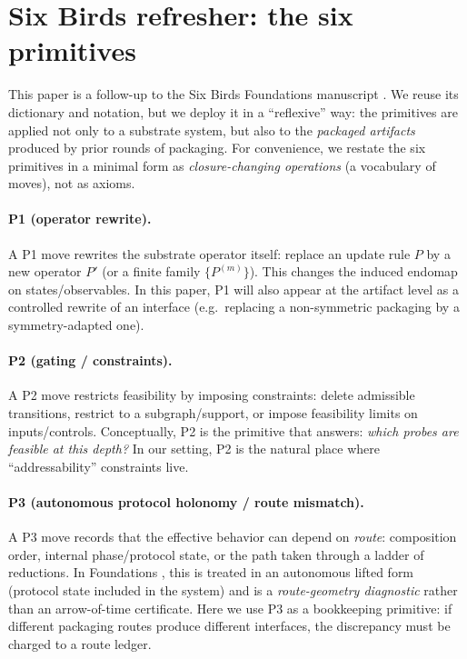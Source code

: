 \documentclass[11pt]{article}
\theoremstyle{plain}
\theoremstyle{definition}
\theoremstyle{remark}
\begin{document}
 \section{Six Birds refresher: the six primitives}\label{sec:six-birds-refresher}

This paper is a follow-up to the Six Birds Foundations manuscript \cite{sixbirds_foundations}.
We reuse its dictionary and notation, but we deploy it in a ``reflexive'' way: the primitives are applied not only to a substrate system, but also to the \emph{packaged artifacts} produced by prior rounds of packaging.
For convenience, we restate the six primitives in a minimal form as \emph{closure-changing operations} (a vocabulary of moves), not as axioms.

\paragraph{P1 (operator rewrite).}
A P1 move rewrites the substrate operator itself: replace an update rule \(P\) by a new operator \(P'\) (or a finite family \(\{P^{(m)}\}\)).
This changes the induced endomap on states/observables.
In this paper, P1 will also appear at the artifact level as a controlled rewrite of an interface (e.g.\ replacing a non-symmetric packaging by a symmetry-adapted one).

\paragraph{P2 (gating / constraints).}
A P2 move restricts feasibility by imposing constraints: delete admissible transitions, restrict to a subgraph/support, or impose feasibility limits on inputs/controls.
Conceptually, P2 is the primitive that answers: \emph{which probes are feasible at this depth?}
In our setting, P2 is the natural place where ``addressability'' constraints live.

\paragraph{P3 (autonomous protocol holonomy / route mismatch).}
A P3 move records that the effective behavior can depend on \emph{route}: composition order, internal phase/protocol state, or the path taken through a ladder of reductions.
In Foundations \cite{sixbirds_foundations}, this is treated in an autonomous lifted form (protocol state included in the system) and is a \emph{route-geometry diagnostic} rather than an arrow-of-time certificate.
Here we use P3 as a bookkeeping primitive: if different packaging routes produce different interfaces, the discrepancy must be charged to a route ledger.
\end{document}
